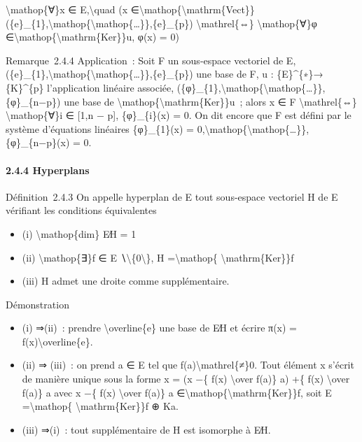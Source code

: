 \documentclass[]{article}
\begin{document}
\textbackslash{}mathop\{∀\}x ∈ E,\textbackslash{}quad (x
∈\textbackslash{}mathop\{\textbackslash{}mathrm\{Vect\}\}(\{e\}\_\{1\},\textbackslash{}mathop\{\textbackslash{}mathop\{\ldots{}\}\},\{e\}\_\{p\})
\textbackslash{}mathrel\{⇔\} \textbackslash{}mathop\{∀\}φ
∈\textbackslash{}mathop\{\textbackslash{}mathrm\{Ker\}\}u, φ(x) = 0)

Remarque~2.4.4 Application~: Soit F un sous-espace vectoriel de E,
(\{e\}\_\{1\},\textbackslash{}mathop\{\textbackslash{}mathop\{\ldots{}\}\},\{e\}\_\{p\})
une base de F, u : \{E\}\^{}\{∗\}→ \{K\}\^{}\{p\} l'application linéaire
associée,
(\{φ\}\_\{1\},\textbackslash{}mathop\{\textbackslash{}mathop\{\ldots{}\}\},\{φ\}\_\{n−p\})
une base de \textbackslash{}mathop\{\textbackslash{}mathrm\{Ker\}\}u~;
alors x ∈ F \textbackslash{}mathrel\{⇔\} \textbackslash{}mathop\{∀\}i ∈
{[}1,n − p{]}, \{φ\}\_\{i\}(x) = 0. On dit encore que F est défini par
le système d'équations linéaires \{φ\}\_\{1\}(x) =
0,\textbackslash{}mathop\{\textbackslash{}mathop\{\ldots{}\}\},\{φ\}\_\{n−p\}(x)
= 0.

\paragraph{2.4.4 Hyperplans}

Définition~2.4.3 On appelle hyperplan de E tout sous-espace vectoriel H
de E vérifiant les conditions équivalentes

\begin{itemize}
\itemsep1pt\parskip0pt
\item
  (i) \textbackslash{}mathop\{dim\} E∕H = 1
\item
  (ii) \textbackslash{}mathop\{∃\}f ∈ E
  ∖\textbackslash{}\{0\textbackslash{}\}, H =\textbackslash{}mathop\{
  \textbackslash{}mathrm\{Ker\}\}f
\item
  (iii) H admet une droite comme supplémentaire.
\end{itemize}

Démonstration

\begin{itemize}
\itemsep1pt\parskip0pt
\item
  (i) ⇒(ii)~: prendre \textbackslash{}overline\{e\} une base de E∕H et
  écrire π(x) = f(x)\textbackslash{}overline\{e\}.
\item
  (ii) ⇒ (iii)~: on prend a ∈ E tel que
  f(a)\textbackslash{}mathrel\{≠\}0. Tout élément x s'écrit de manière
  unique sous la forme x = (x −\{ f(x) \textbackslash{}over f(a)\} a)
  +\{ f(x) \textbackslash{}over f(a)\} a avec x −\{ f(x)
  \textbackslash{}over f(a)\} a
  ∈\textbackslash{}mathop\{\textbackslash{}mathrm\{Ker\}\}f, soit E
  =\textbackslash{}mathop\{ \textbackslash{}mathrm\{Ker\}\}f ⊕ Ka.
\item
  (iii) ⇒(i)~: tout supplémentaire de H est isomorphe à E∕H.
\end{itemize}
\end{document}
